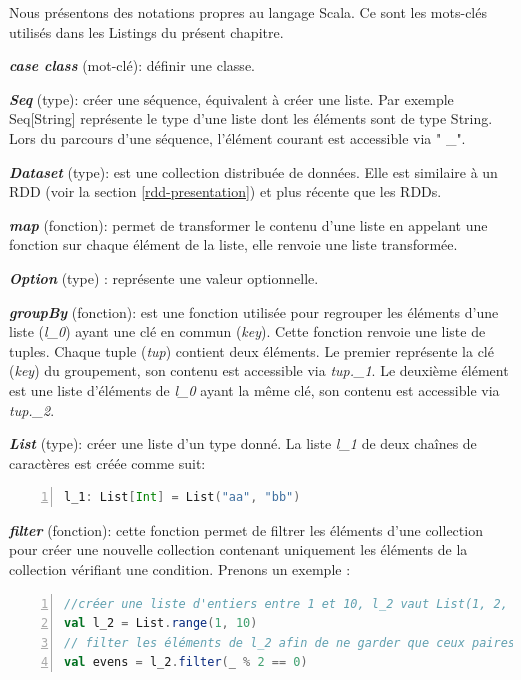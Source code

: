 Nous présentons  des notations   propres au langage Scala. Ce  sont les mots-clés utilisés  dans les Listings du présent chapitre. \par
\textbf{\textit{case class}} (mot-clé): définir une  classe.\par
\textit{\textbf{Seq}} (type): créer une séquence, équivalent à créer une liste. Par exemple Seq[String] représente le type d'une liste dont les éléments sont de type String. Lors du parcours d'une séquence, l'élément courant est accessible via " \_".  \par
\textbf{\textit{Dataset}} (type):  est une collection distribuée de données. Elle est similaire à un RDD (voir la section \ref{rdd-presentation}) et plus récente que les RDDs. \par
\textit{\textbf{map}} (fonction): permet de transformer le contenu d'une liste en appelant une fonction sur chaque élément de la liste, elle renvoie une liste transformée. \par
\textit{\textbf{Option}} (type) : représente une valeur optionnelle.  \par
\textit{\textbf{groupBy}} (fonction):  est une fonction utilisée pour regrouper les éléments d'une liste (\textit{l\_0}) ayant une clé en commun (\textit{key}). Cette fonction renvoie une liste de tuples. Chaque tuple (\textit{tup})  contient deux éléments. Le premier représente la clé (\textit{key})  du groupement, son contenu est accessible via \textit{tup.\_1}. Le deuxième élément est une liste d'éléments de \textit{l\_0} ayant la même clé, son contenu est accessible via \textit{tup.\_2}.\par
\textbf{\textit{List}} (type): créer une liste d'un type donné. La liste \textit{l\_1} de deux chaînes de caractères est créée comme suit:
\begin{lstlisting}[language=scala,firstnumber=1, basicstyle = \footnotesize,escapechar=|,numbers=left,
stepnumber=1]
l_1: List[Int] = List("aa", "bb")
\end{lstlisting} \par
\noindent \textbf{\textit{filter}} (fonction): cette fonction permet de filtrer les éléments d'une collection pour créer une nouvelle collection contenant uniquement les éléments de la collection   vérifiant une condition. Prenons un  exemple : 
\begin{lstlisting}[language=scala,firstnumber=1, basicstyle = \footnotesize,escapechar=|,numbers=left,
stepnumber=1]
//créer une liste d'entiers entre 1 et 10, l_2 vaut List(1, 2, 3, 4, 5, 6, 7, 8, 9)
val l_2 = List.range(1, 10)   
// filter les éléments de l_2 afin de ne garder que ceux paires, evens vaut List(2, 4, 6, 8)
val evens = l_2.filter(_ % 2 == 0)  
\end{lstlisting} \par

